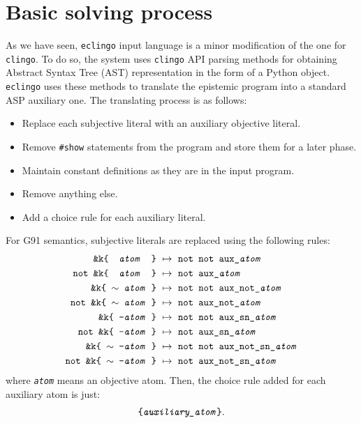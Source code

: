 \documentclass{new_tlp}
\def\eclingo{{\tt eclingo}}
\def\\wviews{{\tt \wviews}}
\def\clingo{{\tt clingo}}
\def\wviews{{\tt wviews}}
\begin{document}
\section{Basic solving process}
\label{sec:impl}
As we have seen, \eclingo{} input language is a minor modification of the one for \clingo{}.
To do so, the system uses \clingo{} API parsing methods for obtaining Abstract Syntax Tree (AST) representation in the form of a Python object. \eclingo{} uses these methods to translate the epistemic program into a standard ASP auxiliary one. The translating process is as follows:
\begin{itemize}
    \item Replace each subjective literal with an auxiliary objective literal.
    \item Remove {\tt \#show} statements from the program and store them for a later phase.
    \item Maintain constant definitions as they are in the input program.
    \item Remove anything else.
    \item Add a choice rule for each auxiliary literal.
\end{itemize}

For G91 semantics, subjective literals are replaced using the following rules:
\begin{align}
    \texttt{\&k\{ \ \emph{atom} \ \}} \ & \mapsto\ \texttt{not\ not\ aux\_\emph{atom}} \label{r:g91_1} \\
    \texttt{not\ \&k\{ \ \emph{atom} \ \}} \ & \mapsto\ \texttt{not\ aux\_\emph{atom}} \label{r:g91_2} \\
    \texttt{\&k\{\ $\sim$ \emph{atom}\  \}}\ & \mapsto\ \texttt{not\ not\ aux\_not\_\emph{atom}} \\
    \texttt{not\ \&k\{\ $\sim$ \emph{atom}\  \}}\ & \mapsto\ \texttt{not\ aux\_not\_\emph{atom}} \\
    \texttt{\&k\{\ {-}\emph{atom}\  \}}\ & \mapsto\ \texttt{not\ not\ aux\_sn\_\emph{atom}} \\
    \texttt{not\ \&k\{\ {-}\emph{atom}\  \}}\ & \mapsto\ \texttt{not\ aux\_sn\_\emph{atom}} \\
    \texttt{\&k\{\ $\sim$ {-}\emph{atom}\  \}}\ & \mapsto\ \texttt{not\ not\ aux\_not\_sn\_\emph{atom}} \\
    \texttt{not\ \&k\{\ $\sim$ {-}\emph{atom}\  \}}\ & \mapsto\ \texttt{not\ aux\_not\_sn\_\emph{atom}} \label{r:g91_8}
\end{align}
where \texttt{\emph{atom}} means an objective atom.
%
Then, the choice rule added for each auxiliary atom is just:
\begin{align*}
    \texttt{\{\emph{auxiliary\_atom}\}}.
\end{align*}
\end{document}
